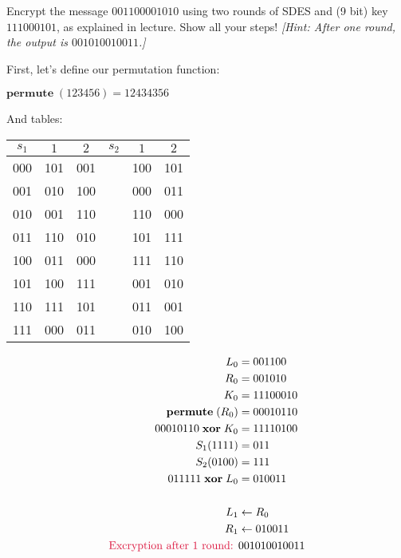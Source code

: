 
\begin{problem}
  Encrypt the message $001100001010$ using two rounds of SDES and (9 bit) key
  $111000101$, as explained in lecture.  Show all your steps! \emph{[Hint: After one round, the output is $001010010011$.]}
  \end{problem}
  
  \begin{Answer}
  \bigskip
  
  \newcommand{\perm}[1]{\mathbf{permute}\;(#1)}
  \newcommand{\xor}[1]{\;\mathbf{xor}\; #1}
  
  First, let's define our permutation function:
  
  \noindent
  $\perm{123456} = 12434356$
  
  \bigskip
  \noindent
  And tables:
  
  \centering
  \begin{tabular}{||c | c | c  | c | c | c ||} 
  \hline
    $s_{1}$ & $1$ & $2$ & $s_{2}$ & $1$ & $2$\\
  \hline
    000 & 101 & 001 &   & 100 & 101\\
  \hline
    001 & 010 & 100 &   & 000 & 011\\
  \hline
    010 & 001 & 110 &   & 110 & 000\\
  \hline
    011 & 110 & 010 &   & 101 & 111\\
  \hline
    100 & 011 & 000 &   & 111 & 110\\
  \hline
    101 & 100 & 111 &   & 001 & 010\\
  \hline
    110 & 111 & 101 &   & 011 & 001\\
  \hline
    111 & 000 & 011 &   & 010 & 100\\
  \hline
  \end{tabular}
  \bigskip
  \flushleft{}
  \begin{multicols}{2}
  
  \begin{align*}
  L_{0} &= 001100\\
  R_{0} &= 001010\\
  K_{0} &= 11100010\\
  \perm{R_{0}} &= 00010110\\
  00010110 \xor K_{0} &= 11110100\\
  S_{1}(1111) &= 011\\
  S_{2}(0100) &= 111\\
  011111 \xor L_{0} &= 010011\\
  \\
  L_{1} &\gets R_{0}\\
  R_{1} &\gets 010011\\
  \text{\crim{Excryption after 1 round: }} &001010010011\\
  \end{align*}
  

\end{multicols}
\end{Answer}
